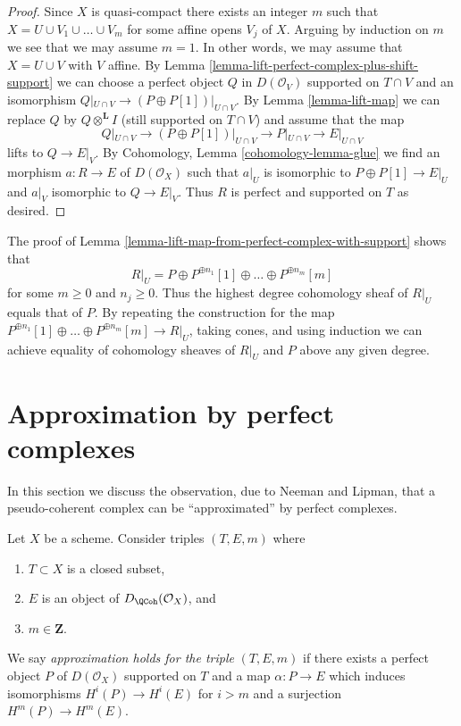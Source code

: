 \begin{proof}
Since $X$ is quasi-compact there exists an integer $m$ such that
$X = U \cup V_1 \cup \ldots \cup V_m$ for some affine opens $V_j$ of $X$.
Arguing by induction on $m$ we see that we may assume $m = 1$. In other
words, we may assume that $X = U \cup V$ with $V$ affine. By
Lemma \ref{lemma-lift-perfect-complex-plus-shift-support}
we can choose a perfect object $Q$ in $D(\mathcal{O}_V)$
supported on $T \cap V$ and an isomorphism
$Q|_{U \cap V} \to (P \oplus P[1])|_{U \cap V}$.
By Lemma \ref{lemma-lift-map} we can replace $Q$ by
$Q \otimes^\mathbf{L} I$ (still supported on $T \cap V$)
and assume that the map
$$
Q|_{U \cap V} \to (P \oplus P[1])|_{U \cap V}
\longrightarrow P|_{U \cap V}
\longrightarrow
E|_{U \cap V}
$$
lifts to $Q \to E|_V$. By
Cohomology, Lemma \ref{cohomology-lemma-glue}
we find an morphism $a : R \to E$ of $D(\mathcal{O}_X)$
such that $a|_U$ is isomorphic to $P \oplus P[1] \to E|_U$
and $a|_V$ isomorphic to $Q \to E|_V$.
Thus $R$ is perfect and supported on $T$ as desired.
\end{proof}

\begin{remark}
\label{remark-addendum}
The proof of Lemma \ref{lemma-lift-map-from-perfect-complex-with-support}
shows that
$$
R|_U = P \oplus P^{\oplus n_1}[1] \oplus \ldots \oplus P^{\oplus n_m}[m]
$$
for some $m \geq 0$ and $n_j \geq 0$. Thus the highest degree cohomology sheaf
of $R|_U$ equals that of $P$. By repeating the construction for the map
$P^{\oplus n_1}[1] \oplus \ldots \oplus P^{\oplus n_m}[m] \to R|_U$, taking
cones, and using induction we can achieve equality of cohomology sheaves
of $R|_U$ and $P$ above any given degree.
\end{remark}



\section{Approximation by perfect complexes}
\label{section-approximation}

\noindent
In this section we discuss the observation, due to Neeman and Lipman,
that a pseudo-coherent complex can be ``approximated'' by perfect complexes.

\begin{definition}
\label{definition-approximation-holds}
Let $X$ be a scheme. Consider triples $(T, E, m)$ where
\begin{enumerate}
\item $T \subset X$ is a closed subset,
\item $E$ is an object of $D_\QCoh(\mathcal{O}_X)$, and
\item $m \in \mathbf{Z}$.
\end{enumerate}
We say {\it approximation holds for the triple} $(T, E, m)$ if
there exists a perfect object $P$ of $D(\mathcal{O}_X)$ supported on $T$
and a map $\alpha : P \to E$ which induces isomorphisms $H^i(P) \to H^i(E)$
for $i > m$ and a surjection $H^m(P) \to H^m(E)$.
\end{definition}

